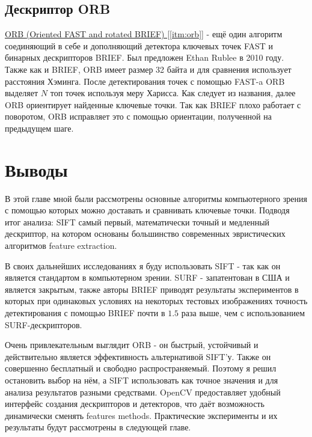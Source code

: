 \subsection{Дескриптор ORB}

\hyperref[itm:orb]{ ORB (Oriented FAST and rotated BRIEF) [\ref{itm:orb}]} - ещё один алгоритм соединяющий в себе и дополняющий детектора ключевых точек FAST и бинарных дескрипторов BRIEF. Был предложен Ethan Rublee в 2010 году. Также как и BRIEF, ORB имеет размер 32 байта и для сравнения использует расстояния Хэминга. После детектирования точек с помощью FAST-a ORB выделяет $N$ топ точек используя меру Харисса. Как следует из названия, далее ORB ориентирует найденные ключевые точки. Так как BRIEF плохо работает с поворотом, ORB исправляет это с помощью ориентации, полученной на предыдущем шаге.

\section{Выводы}

В этой главе мной были рассмотрены основные алгоритмы компьютерного зрения с помощью которых можно доставать и сравнивать ключевые точки. Подводя итог анализа: SIFT самый первый, математически точный и медленный дескриптор, на котором основаны большинство современных эвристических алгоритмов feature extraction.

В своих дальнейших исследованиях я буду использовать SIFT - так как он является стандартом в компьютерном зрении. SURF - запатентован в США и является закрытым, также авторы BRIEF приводят результаты экспериментов в которых при одинаковых условиях на некоторых тестовых изображениях точность детектирования с помощью BRIEF почти в $1.5$ раза выше, чем с использованием SURF-дескрипторов.

Очень привлекательным выглядит ORB - он быстрый, устойчивый и действительно является эффективность альтернативой SIFT'у. Также он совершенно бесплатный и свободно распространяемый. Поэтому я решил остановить выбор на нём, а SIFT использовать как точное значения и для анализа результатов разными средствами. OpenCV предоставляет удобный интерфейс создания дескрипторов и детекторов, что даёт возможность динамически сменять features methods. Практические эксперименты и их результаты будут рассмотрены в следующей главе.

\newpage